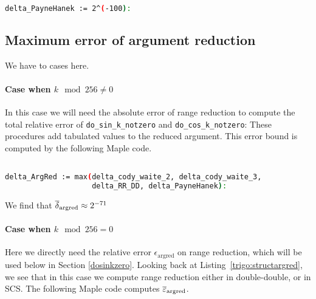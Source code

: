 \begin{lstlisting}[caption={Computing constants for Cody and Waite
    double-double}, firstnumber=1,
  language={sh}, numbers=none]% of course it's maple
%Skip a line here, I don't know why, otherwise latex eats the first line

delta_PayneHanek := 2^(-100):
\end{lstlisting}


\subsection{Maximum error of argument reduction }

We have to cases here.

\paragraph*{Case when $k\mod 256\ne 0$}

In this case we will need the absolute error of range reduction to compute the
total relative error of \verb!do_sin_k_notzero! and
\verb!do_cos_k_notzero!: These procedures add tabulated values to the
reduced argument. This error bound is computed by the following Maple code.

\begin{lstlisting}[caption={Maple script computing the absolute error bound of range reduction}, firstnumber=1,
  language={sh}, numbers=none]% of course it's maple
%Skip a line here, I don't know why, otherwise latex eats the first line

delta_ArgRed := max(delta_cody_waite_2, delta_cody_waite_3,
                    delta_RR_DD, delta_PayneHanek):
\end{lstlisting}

We find that ${\overline{\delta}}_{\mathrm{argred}}\approx 2^{-71}$


\paragraph*{Case when $k\mod 256= 0$}

Here we directly need the relative error $\epsilon_{\mathrm{argred}}$
on range reduction, which will be used below in Section
\ref{dosinkzero}. Looking back at Listing~\ref{trigo:structargred}, we
see that in this case we compute range reduction either in
double-double, or in SCS. The following Maple code computes
${\overline{\varepsilon}}_{\mathrm{argred}}$.

